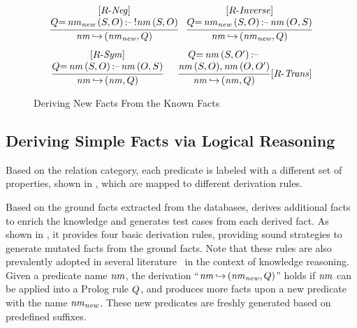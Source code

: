 \begin{figure}[!b]
\centering
\small
\begin{gather*}
\frac{
\begin{matrix}
[R\text{-}\mathit{Neg}]\\
{Q}{=}\,\mathit{nm}_{\mathit{new}}\,(S, O){\,\text{:--}\,} !\mathit{nm}\,(S, O)
\end{matrix}
}{
\mathit{nm}\,{\hookrightarrow}\,(\mathit{nm}_{\mathit{new}}, {Q})}
\ \  
\frac{
\begin{matrix}
[R\text{-}\mathit{Inverse}]\\
{Q}{=}\,\mathit{nm}_{\mathit{new}}\,(S, O) {\,\text{:--}\,} \mathit{nm}\,(O, S)
\end{matrix}
}{
\mathit{nm}\,{\hookrightarrow}\,(\mathit{nm}_{\mathit{new}}, {Q})}
\\[0.4em]
\frac{
\begin{matrix}
[R\text{-}\mathit{Sym}]\\
{Q}{=}\,\mathit{nm}\,(S, O) {\,\text{:--}\,} \mathit{nm}\,(O, S)
\end{matrix}
}{
\mathit{nm}\,{\hookrightarrow}\,(\mathit{nm}, {Q})}
\quad\   
\frac{
\begin{matrix}
{Q}{=}\,\mathit{nm}\,(S, O') {\,\text{:--}\,} 
\\ 
\mathit{nm}\,(S, O), 
\mathit{nm}\,(O, O')
\end{matrix}
}{
\mathit{nm}\,{\hookrightarrow}\,(\mathit{nm}, {Q})}  [R\text{-}\mathit{Trans}]
\end{gather*}
\caption{Deriving New Facts From the Known Facts}
\label{fig:basic_op_for_predicates}
\end{figure}


\vspace{-2mm}
\subsection{Deriving Simple Facts via Logical Reasoning}
\label{sec:derive_more_facts}
Based on the relation category, each predicate is labeled with a different set of properties, shown in , which are mapped to different derivation rules. 

Based on the ground facts extracted from the databases, \tool derives additional facts to enrich the knowledge and generates test cases from each derived fact. 
As shown in , it provides four basic derivation rules, 
providing sound strategies to generate mutated facts from the ground facts. %
Note that these rules are also prevalently adopted in several literature~\cite{zhou2019completing, ren2020beta, liang2022reasoning, TIAN2022100159, abboud2020boxe} in the context of knowledge reasoning.
Given a predicate name $\mathit{nm}$, the derivation  ``$\mathit{nm}\,{\hookrightarrow}\,(\mathit{nm}_{\mathit{new}}, {Q})$'' holds if $\mathit{nm}$ can be applied into a Prolog rule ${Q}$, and produces more facts upon a new predicate with the name  $\mathit{nm}_{\mathit{new}}$. 
These new predicates are freshly generated based on predefined suffixes. 



